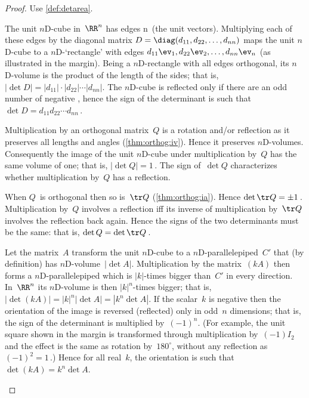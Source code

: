 \begin{proof} Use \autoref{def:detarea}.
\begin{description}
\item[\ref{thm:basicdet:i}]
The unit $n$D-cube in~\(\RR^n\) has edges \hlist\ev n\ (the unit vectors).
Multiplying each of these edges by the diagonal matrix \(D=\diag(d_{11},d_{22},\ldots,d_{nn})\) maps the unit $n$D-cube to a $n$D-`rectangle' with edges \(d_{11}\ev_1,d_{22}\ev_2,\ldots,d_{nn}\ev_n\) (as illustrated in the margin).
Being a $n$D-rectangle with all edges orthogonal, its $n$D-volume is the product of the length of the sides; that is, \(|\det D|=|d_{11}|\cdot|d_{22}|\cdots |d_{nn}|\).
The $n$D-cube is reflected only if there are an odd number of negative , hence the sign of the determinant is such that \(\det D=d_{11}d_{22}\cdots d_{nn}\)\,.

\item[\ref{thm:basicdet:ii}]
Multiplication by an orthogonal matrix~\(Q\) is a rotation and/or reflection as it preserves all lengths and angles (\autoref{thm:orthog:iv}).
Hence it preserves $n$D-volumes.
Consequently the image of the unit $n$D-cube under multiplication by~\(Q\) has the same volume of one; that is, \(|\det Q|=1\)\,.
The sign of~\(\det Q\) characterizes whether multiplication by~\(Q\) has a reflection.

When \(Q\)~is orthogonal then so is~\(\tr Q\) (\autoref{thm:orthog:ia}).  Hence \(\det\tr Q=\pm1\)\,.
Multiplication by~\(Q\) involves a reflection iff its inverse of multiplication by~\(\tr Q\) involves the reflection back again.
Hence the signs of the two determinants must be the same: that is, \(\det Q=\det\tr Q\)\,.

\item[\ref{thm:basicdet:iii}]
Let the matrix~\(A\) transform the unit $n$D-cube to a $n$D-parallelepiped~\(C'\) that  (by definition) has $n$D-volume~\(|\det A|\).
Multiplication by the matrix~\((kA)\) then forms a $n$D-parallelepiped which is \(|k|\)-times bigger than~\(C'\) in every direction.
In~\(\RR^n\) its $n$D-volume is then \(|k|^n\)-times bigger; that is,
\(|\det(kA)|=|k|^n|\det A|=|k^n\det A|\).
If the scalar~\(k\) is negative then the orientation of the image is reversed (reflected) only in odd~\(n\) dimensions; that is, the sign of the determinant is multiplied by~\((-1)^n\).
%
(For example, the unit square shown in the margin is transformed through multiplication by~\((-1)I_2\) and the effect is the same as rotation by~\(180^\circ\), without any reflection as \((-1)^2=1\)\,.)
Hence for all real~\(k\), the orientation is such that \(\det(kA)=k^n\det A\). 
\end{description}
\end{proof}




